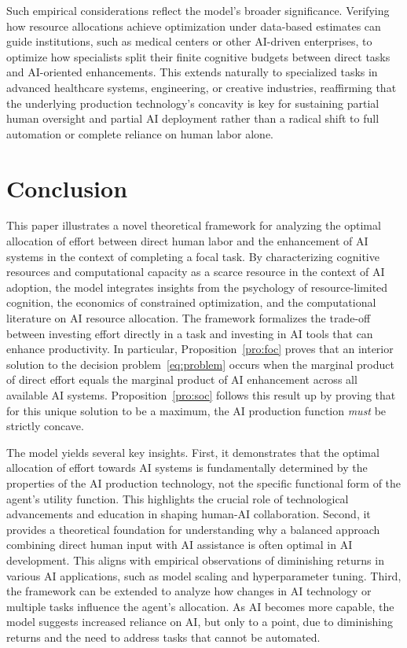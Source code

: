 \documentclass[11pt]{article}
\theoremstyle{definition}
\theoremstyle{remark}
\begin{document}
Such empirical considerations reflect the model's broader significance. Verifying how resource allocations achieve optimization under data-based estimates can guide institutions, such as medical centers or other AI-driven enterprises, to optimize how specialists split their finite cognitive budgets between direct tasks and AI-oriented enhancements. This extends naturally to specialized tasks in advanced healthcare systems, engineering, or creative industries, reaffirming that the underlying production technology's concavity is key for sustaining partial human oversight and partial AI deployment rather than a radical shift to full automation or complete reliance on human labor alone.



\section{Conclusion}
\label{sec:con}
This paper illustrates a novel theoretical framework for analyzing the optimal allocation of effort between direct human labor and the enhancement of AI systems in the context of completing a focal task. By characterizing cognitive resources and computational capacity as a scarce resource in the context of AI adoption, the model integrates insights from the psychology of resource-limited cognition, the economics of constrained optimization, and the computational literature on AI resource allocation. The framework formalizes the trade-off between investing effort directly in a task and investing in AI tools that can enhance productivity. In particular, Proposition~\ref{pro:foc} proves that an interior solution to the decision problem~\ref{eq:problem} occurs when the marginal product of direct effort equals the marginal product of AI enhancement across all available AI systems. Proposition~\ref{pro:soc} follows this result up by proving that for this unique solution to be a maximum, the AI production function \textit{must} be strictly concave.

The model yields several key insights. First, it demonstrates that the optimal allocation of effort towards AI systems is fundamentally determined by the properties of the AI production technology, not the specific functional form of the agent’s utility function. This highlights the crucial role of technological advancements and education in shaping human-AI collaboration. Second, it provides a theoretical foundation for understanding why a balanced approach combining direct human input with AI assistance is often optimal in AI development. This aligns with empirical observations of diminishing returns in various AI applications, such as model scaling and hyperparameter tuning. Third, the framework can be extended to analyze how changes in AI technology or multiple tasks influence the agent’s allocation. As AI becomes more capable, the model suggests increased reliance on AI, but only to a point, due to diminishing returns and the need to address tasks that cannot be automated.
\end{document}
